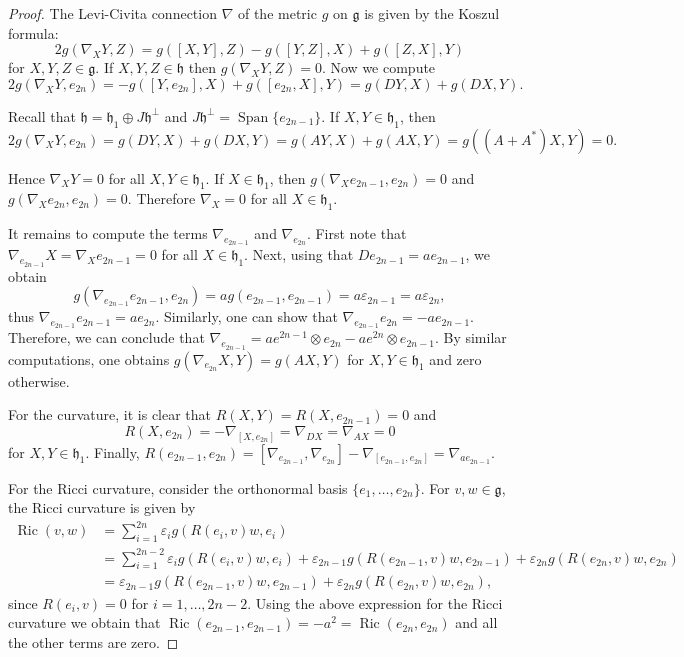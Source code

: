 \documentclass{article}
\theoremstyle{definition}
\DeclareMathOperator{\Ric}{Ric}
\newcommand{\frg}{\mathfrak{g}}
\newcommand{\frh}{\mathfrak{h}}
\newcommand{\Span}[1]{\operatorname{Span}\{#1\}}
\begin{document}
\begin{proof}
    The Levi-Civita connection $\nabla$ of the metric $g$ on $\frg$ is given by the Koszul formula: \begin{equation}\label{eq:Koszul}
        2g(\nabla_XY,Z)=g([X,Y],Z)-g([Y,Z],X)+g([Z,X],Y)
    \end{equation} for $X,Y,Z\in\frg$. If $X,Y,Z\in\frh$ then $g(\nabla_XY,Z)=0$. Now we compute $$2g(\nabla_XY,e_{2n})=-g([Y,e_{2n}],X)+g([e_{2n},X],Y)=g(DY,X)+g(DX,Y).$$

    Recall that $\frh=\frh_1\oplus J\frh^\perp$ and $J\frh^\perp=\Span{e_{2n-1}}$. If $X,Y\in\frh_1$, then $$2g(\nabla_XY,e_{2n})=g(DY,X)+g(DX,Y)=g(AY,X)+g(AX,Y)=g((A+A^*)X,Y)=0.$$

    Hence $\nabla_XY=0$ for all $X,Y\in\frh_1$. If $X\in\frh_1$, then $g(\nabla_Xe_{2n-1},e_{2n})=0$ and $g(\nabla_Xe_{2n},e_{2n})=0$. Therefore $\nabla_X=0$ for all $X\in\frh_1$.\medskip

    It remains to compute the terms $\nabla_{e_{2n-1}}$ and $\nabla_{e_{2n}}$. First note that $\nabla_{e_{2n-1}}X=\nabla_Xe_{2n-1}=0$ for all $X\in\frh_1$. Next, using that $De_{2n-1}=ae_{2n-1}$, we obtain $$g(\nabla_{e_{2n-1}}e_{2n-1},e_{2n})=ag(e_{2n-1},e_{2n-1})=a\varepsilon_{2n-1}=a\varepsilon_{2n},$$ thus $\nabla_{e_{2n-1}}e_{2n-1}=ae_{2n}$. Similarly, one can show that $\nabla_{e_{2n-1}}e_{2n}=-ae_{2n-1}$. Therefore, we can conclude that $\nabla_{e_{2n-1}}=ae^{2n-1}\otimes e_{2n}-ae^{2n}\otimes e_{2n-1}$. By similar computations, one obtains $g(\nabla_{e_{2n}}X,Y)=g(AX,Y)$ for $X,Y\in\frh_1$ and zero otherwise.\medskip

    For the curvature, it is clear that $R(X,Y)=R(X,e_{2n-1})=0$ and $$R(X,e_{2n})=-\nabla_{[X,e_{2n}]}=\nabla_{DX}=\nabla_{AX}=0$$ for $X,Y\in\frh_1$. Finally, $R(e_{2n-1},e_{2n})=[\nabla_{e_{2n-1}},\nabla_{e_{2n}}]-\nabla_{[e_{2n-1},e_{2n}]}=\nabla_{ae_{2n-1}}$.\medskip

    For the Ricci curvature, consider the orthonormal basis $\{e_1,\ldots,e_{2n}\}$. For $v,w\in\frg$, the Ricci curvature is given by \begin{align*}
        \Ric(v,w)&=\sum_{i=1}^{2n}\varepsilon_ig(R(e_i,v)w,e_i)\\
        &=\sum_{i=1}^{2n-2}\varepsilon_ig(R(e_i,v)w,e_i)+\varepsilon_{2n-1}g(R(e_{2n-1},v)w,e_{2n-1})+\varepsilon_{2n}g(R(e_{2n},v)w,e_{2n})\\
        &=\varepsilon_{2n-1}g(R(e_{2n-1},v)w,e_{2n-1})+\varepsilon_{2n}g(R(e_{2n},v)w,e_{2n}),
    \end{align*} since $R(e_i,v)=0$ for $i=1,\ldots,2n-2$. Using the above expression for the Ricci curvature we obtain that $\Ric(e_{2n-1},e_{2n-1})=-a^2=\Ric(e_{2n},e_{2n})$ and all the other terms are zero.
\end{proof}
\end{document}
